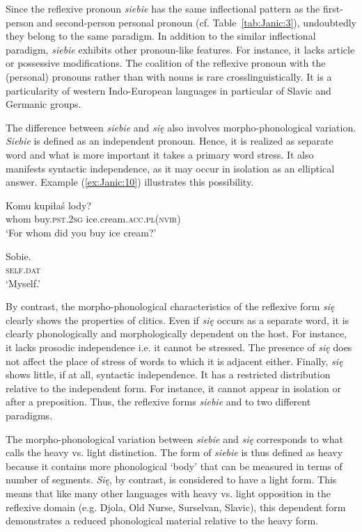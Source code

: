 \documentclass[output=paper]{langscibook}
\begin{document}
Since the reflexive pronoun \textit{siebie} has the same inflectional pattern as the first-person and second-person personal pronoun (cf. Table~\ref{tab:Janic:3}), undoubtedly they belong to the same paradigm. In addition to the similar inflectional paradigm, \textit{siebie} exhibits other pronoun-like features. For instance, it lacks article or possessive modifications. The coalition of the reflexive pronoun with the (personal) pronouns rather than with nouns is rare crosslinguistically. It is a particularity of western Indo-European languages in particular of Slavic and Germanic groups.

The difference between \textit{siebie} and \textit{się} also involves morpho-phonological variation. \textit{Siebie} is defined as an independent pronoun. Hence, it is realized as separate word and what is more important it takes a primary word stress. It also manifests syntactic independence, as it may occur in isolation as an elliptical answer. Example (\ref{ex:Janic:10}) illustrates this possibility.

\ea \label{ex:Janic:10}
\ea \label{ex:Janic:10a}
\gll Komu	kupiłaś		 lody? \\
		whom	buy.\textsc{pst.2sg}	ice.cream.\textsc{acc.pl(nvir)} \\
\glt ‘For whom did you buy ice cream?’

\ex \label{ex:Janic:10b}
\gll Sobie.\\
		\textsc{self.dat}	\\
\glt ‘Myself.’ \citep[278]{Sadowska2012}
\z
\z

By contrast, the morpho-phonological characteristics of the reflexive form \textit{się} clearly shows the properties of clitics. Even if \textit{się} occurs as a separate word, it is clearly phonologically and morphologically dependent on the host. For instance, it lacks prosodic independence i.e. it cannot be stressed. The presence of \textit{się} does not affect the place of stress of words to which it is adjacent either. Finally, \textit{się} shows little, if at all, syntactic independence. It has a restricted distribution relative to the independent form. For instance, it cannot appear in isolation or after a preposition. Thus, the reflexive forms \textit{siebie} and to two different paradigms.

The morpho-phonological variation between \textit{siebie} and \textit{się} corresponds to what \citet{Kemmer1993}  calls the heavy vs. light distinction. The form of \textit{siebie} is thus defined as heavy because it contains more phonological ‘body’ that can be measured in terms of number of segments. \textit{Się}, by contrast, is considered to have a light form. This means that like many other languages with heavy vs. light opposition in the reflexive domain (e.g. Djola, Old Nurse, Surselvan, Slavic), this dependent form demonstrates a reduced phonological material relative to the heavy form. 
\end{document}
